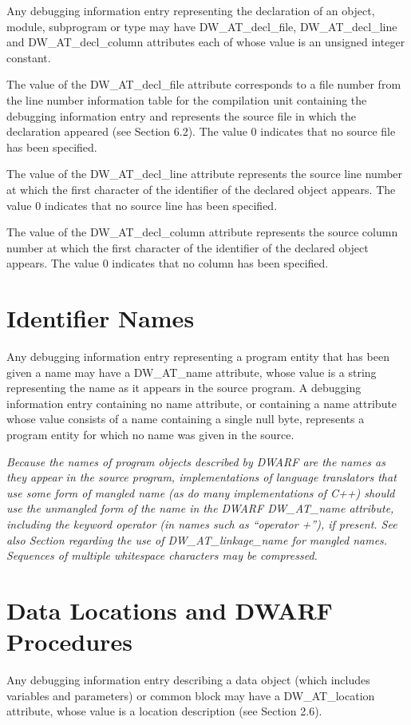 Any debugging information entry representing the
declaration of an object, module, subprogram or type may have
DW\_AT\_decl\_file, DW\_AT\_decl\_line and DW\_AT\_decl\_column
attributes each of whose value is an unsigned integer constant.

The value of the DW\_AT\_decl\_file attribute corresponds to
a file number from the line number information table for the
compilation unit containing the debugging information entry and
represents the source file in which the declaration appeared
(see Section 6.2). The value 0 indicates that no source file
has been specified.

The value of the DW\_AT\_decl\_line attribute represents
the source line number at which the first character of
the identifier of the declared object appears. The value 0
indicates that no source line has been specified.

The value of the DW\_AT\_decl\_column attribute represents
the source column number at which the first character of
the identifier of the declared object appears. The value 0
indicates that no column has been specified.

\section{Identifier Names}
\label{chap:identifiernames}
Any debugging information entry representing a program entity
that has been given a name may have a DW\_AT\_name attribute,
whose value is a string representing the name as it appears in
the source program. A debugging information entry containing
no name attribute, or containing a name attribute whose value
consists of a name containing a single null byte, represents
a program entity for which no name was given in the source.

\textit{Because the names of program objects described by DWARF are the
names as they appear in the source program, implementations
of language translators that use some form of mangled name
(as do many implementations of C++) should use the unmangled
form of the name in the DWARF DW\_AT\_name attribute,
including the keyword operator (in names such as “operator
+”), if present. See also 
Section  regarding the use
of DW\_AT\_linkage\_name for mangled names. Sequences of
multiple whitespace characters may be compressed.}

\section{Data Locations and DWARF Procedures}
Any debugging information entry describing a data object (which
includes variables and parameters) or common block may have a
DW\_AT\_location attribute, whose value is a location description
(see Section 2.6).  

